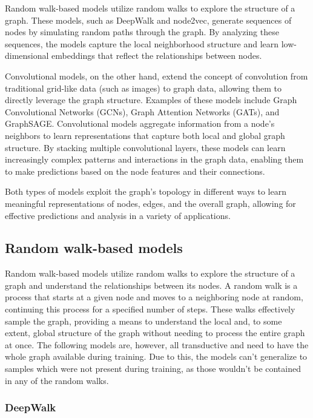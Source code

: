 Random walk-based models utilize random walks to explore the structure of a graph. These models, such as DeepWalk and node2vec, generate sequences of nodes by simulating random paths through the graph. By analyzing these sequences, the models capture the local neighborhood structure and learn low-dimensional embeddings that reflect the relationships between nodes.

Convolutional models, on the other hand, extend the concept of convolution from traditional grid-like data (such as images) to graph data, allowing them to directly leverage the graph structure. Examples of these models include Graph Convolutional Networks (GCNs), Graph Attention Networks (GATs), and GraphSAGE\@. Convolutional models aggregate information from a node’s neighbors to learn representations that capture both local and global graph structure. By stacking multiple convolutional layers, these models can learn increasingly complex patterns and interactions in the graph data, enabling them to make predictions based on the node features and their connections.

Both types of models exploit the graph's topology in different ways to learn meaningful representations of nodes, edges, and the overall graph, allowing for effective predictions and analysis in a variety of applications.

\subsection{Random walk-based models}

Random walk-based models utilize random walks to explore the structure of a graph and understand the relationships between its nodes. A random walk is a process that starts at a given node and moves to a neighboring node at random, continuing this process for a specified number of steps. These walks effectively sample the graph, providing a means to understand the local and, to some extent, global structure of the graph without needing to process the entire graph at once. The following models are, however, all transductive and need to have the whole graph available during training. Due to this, the models can't generalize to samples which were not present during training, as those wouldn't be contained in any of the random walks.

\subsubsection{DeepWalk}

